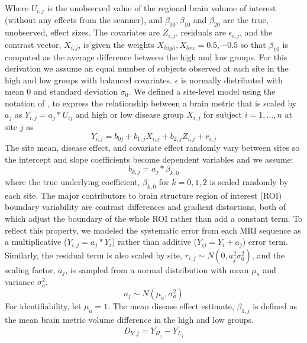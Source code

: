 \documentclass{article}
\begin{document}
Where $U_{i,j}$ is the unobserved value of the regional brain volume of interest (without any effects from the scanner), and $\beta_{00}, \beta_{10}$ and $\beta_{20}$ are the true, unobserved, effect sizes. The covariates are $Z_{i,j}$, residuals are $\epsilon_{i,j}$, and the contrast vector, $X_{i,j}$, is given the weights $X_{high}, X_{low} = 0.5,-0.5$ so that $\beta_{10}$ is computed as the average difference between the high and low groups. For this derivation we assume an equal number of subjects observed at each site in the high and low groups with balanced covariates. $\epsilon$ is normally distributed with mean 0 and standard deviation $\sigma_0$. 
We defined a site-level model using the notation of \cite{Raudenbush2000}, to express the relationship between a brain metric that is scaled by $a_j$ as $Y_{i,j} = a_j*U_{ij}$ and high or low disease group $X_{i,j}$ for subject $i=1,\ldots,n$ at site $j$  as 
\begin{equation}
Y_{i,j} = b_{0j} + b_{1,j}X_{i,j} + b_{2,j}Z_{i,j} + r_{i,j}
\end{equation}
 The site mean, disease effect, and covariate effect randomly vary between sites so the intercept and slope coefficients become dependent variables \cite{Raudenbush2000} and we assume:
\begin{equation}
\label{alphascale}
b_{k,j} = a_{j}*\beta_{k,0}
\end{equation}
where the true underlying coefficient,
$\beta_{k,0}$ for  $k=0,1,2$ is scaled randomly by each site. The major contributors to brain structure region of interest (ROI) boundary variability are contrast differences and gradient distortions, both of which adjust the boundary of the whole ROI rather than add a constant term. To reflect this property, we modeled the systematic error from each MRI sequence as a multiplicative ($Y_{i,j} = a_j*Y_i$) rather than additive ($Y_{ij} = Y_i + a_j$) error term. Similarly, the residual term is also scaled by site, $r_{i,j} \sim N(0,a_j^2\sigma_0^2)$, and the scaling factor, $a_j$, is sampled from a normal distribution with mean $\mu_a$ and variance $\sigma_{a}^2$.
\begin{equation}
a_j \sim N(\mu_{a},\sigma_a^2)
\end{equation}
For identifiability, let $\mu_{a} = 1$. The mean disease effect estimate, $\beta_{1,j}$ is defined as the mean brain metric volume difference in the high and low groups.
\begin{equation}
\label{meanbeta}
D_{Y,j} = \overline{Y_{H_j}} - \overline{Y_{L_j}}
\end{equation}
\end{document}
